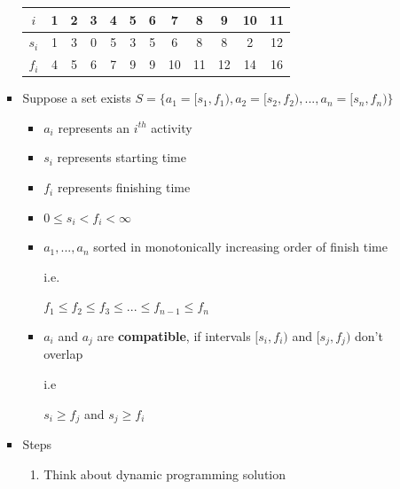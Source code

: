 \documentclass[12pt]{article}
\begin{document}
\begin{enumerate}[1.]
\begin{itemize}
\begin{itemize}
            \begin{tabular}{c|ccccccccccc}
                $i$ & 1 & 2 & 3 & 4 & 5 & 6 & 7 & 8 & 9 & 10 & 11\\
                \hline
                $s_i$ & 1 & 3 & 0 & 5 & 3 & 5 & 6 & 8 & 8 & 2 & 12\\
                $f_i$ & 4 & 5 & 6 & 7 & 9 & 9 & 10 & 11 & 12 & 14 & 16
            \end{tabular}

            \bigskip

            \item Suppose a set exists $S = \{a_1 = [s_1, f_1), a_2 = [s_2, f_2), ..., a_n = [s_n, f_n)\}$

            \begin{itemize}
                \item $a_i$ represents an $i^{th}$ activity
                \item $s_i$ represents starting time
                \item $f_i$ represents finishing time
                \item $0 \leq s_i < f_i < \infty$
                \item $a_1, ..., a_n$ sorted in monotonically increasing order of finish time

                \bigskip

                \quad i.e.

                \bigskip

                \quad $f_1 \leq f_2 \leq f_3 \leq ... \leq f_{n-1} \leq f_n$

                \bigskip

                \item $a_i$ and $a_j$ are \textbf{compatible}, if intervals $[s_i, f_i)$ and $[s_j, f_j)$
                don't overlap

                \bigskip

                \quad i.e

                \bigskip

                \quad $s_i \geq f_j$ and $s_j \geq f_i$

                \bigskip

            \end{itemize}

            \item Steps

            \begin{enumerate}[1.]
                \item Think about dynamic programming solution


\end{enumerate}
\end{itemize}
\end{itemize}
\end{enumerate}
\end{document}
